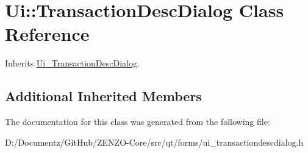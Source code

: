 \hypertarget{class_ui_1_1_transaction_desc_dialog}{}\section{Ui\+::Transaction\+Desc\+Dialog Class Reference}
\label{class_ui_1_1_transaction_desc_dialog}


Inherits \mbox{\hyperlink{class_ui___transaction_desc_dialog}{Ui\+\_\+\+Transaction\+Desc\+Dialog}}.

\subsection*{Additional Inherited Members}


The documentation for this class was generated from the following file\+:\begin{DoxyCompactItemize}
\item 
D\+:/\+Documentz/\+Git\+Hub/\+Z\+E\+N\+Z\+O-\/\+Core/src/qt/forms/ui\+\_\+transactiondescdialog.\+h\end{DoxyCompactItemize}
